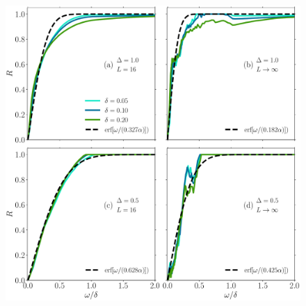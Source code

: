 \begin{figure}[htbp]
  \centering
  \includegraphics[width=1.0\textwidth]{Figures/O12_symmetry_breaking.pdf}
  \caption{}\label{fig:O12 symmetry}
\end{figure}
